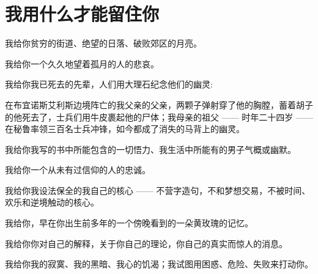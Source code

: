 \section{我用什么才能留住你}

我给你贫穷的街道、绝望的日落、破败郊区的月亮。

我给你一个久久地望着孤月的人的悲哀。

我给你我已死去的先辈，人们用大理石纪念他们的幽灵:

在布宜诺斯艾利斯边境阵亡的我父亲的父亲，两颗子弹射穿了他的胸膛，蓄着胡子的他死去了，士兵们用牛皮裹起他的尸体；我母亲的祖父 —— 时年二十四岁 —— 在秘鲁率领三百名士兵冲锋，如今都成了消失的马背上的幽灵。

我给你我写的书中所能包含的一切悟力、我生活中所能有的男子气概或幽默。

我给你一个从未有过信仰的人的忠诚。

我给你我设法保全的我自己的核心 —— 不营字造句，不和梦想交易，不被时间、欢乐和逆境触动的核心。

我给你，早在你出生前多年的一个傍晚看到的一朵黄玫瑰的记忆。

我给你你对自己的解释，关于你自己的理论，你自己的真实而惊人的消息。

我给你我的寂寞、我的黑暗、我心的饥渴；我试图用困惑、危险、失败来打动你。　　
